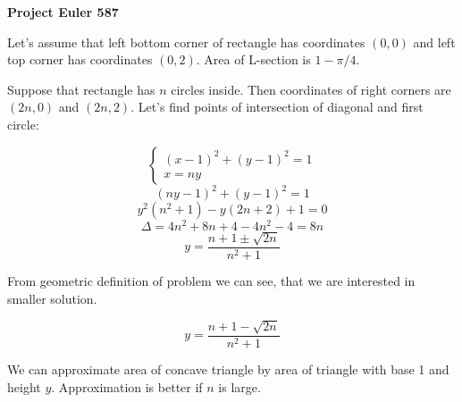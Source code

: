 \documentclass[a4paper,12pt]{article}
\begin{document}
\setlength\parindent{0pt}
\textbf{Project Euler 587}
\vspace{5ex}

Let's assume that left bottom corner of rectangle has coordinates \((0, 0)\) and left top corner has coordinates \((0, 2)\). Area of L-section is \(1 - \pi / 4\).

Suppose that rectangle has \(n\) circles inside. Then coordinates of right corners are \((2n, 0)\) and \((2n, 2)\). Let's find points of intersection of diagonal and first circle:

\[
\begin{cases}
(x - 1)^2 + (y - 1)^2 = 1 \\
x = ny
\end{cases}
\]
\[(ny - 1)^2 + (y - 1)^2 = 1\]
\[y^2 (n^2 + 1) - y (2n + 2) + 1 = 0\]
\[\Delta = 4n^2 + 8n + 4 - 4n^2 - 4 = 8n\]
\[y = \frac{n + 1 \pm \sqrt{2n}}{n^2 + 1}\]

From geometric definition of problem we can see, that we are interested in smaller solution.

\[y = \frac{n + 1 - \sqrt{2n}}{n^2 + 1}\]

We can approximate area of concave triangle by area of triangle with base 1 and height \(y\). Approximation is better if \(n\) is large.
\end{document}
